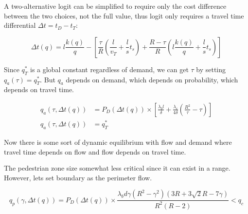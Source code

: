 \documentclass{article}
\begin{document}
A two-alternative logit can be simplified to require only the cost difference between the two choices, not the full value, thus logit only requires a travel time differential $\Delta t = t_D - t_T$:

\begin{equation}
    \Delta t(q) = l \frac{k(q)}{q} - \left[
    \frac{\tau}{R} \left( \frac{l}{v_T} + \frac{l}{s}t_s \right) + \frac{R-\tau}{R} \left( l\frac{k(q)}{q} + \frac{l}{s}t_s \right) \right]
\end{equation}

\noindent Since $q^*_T$ is a global constant regardless of demand, we can get $\tau$ by setting $q_a(\tau)=q^*_T$. But $q_a$ depends on demand, which depends on probability, which depends on travel time.

\begin{align}
    q_a(\tau, \Delta t(q)) & = P_D(\Delta t(q)) \times \left[ \frac{\lambda_b l}{\delta} + \frac{\lambda_c}{4\delta} \left( \frac{R^2}{\tau} - \tau \right) \right] \\
    q_a(\tau, \Delta t(q)) & = q^*_T
\end{align}

\noindent Now there is some sort of dynamic equilibrium with flow and demand where travel time depends on flow and flow depends on travel time. 

The pedestrian zone size somewhat less critical since it can exist in a range. However, lets set boundary as the perimeter flow.

\begin{equation}
        q_p(\gamma, \Delta t(q)) = P_D(\Delta t(q)) \times \frac{\lambda_b d \gamma (R^2 - \gamma^2) (3R + 3\sqrt{2}R - 7\gamma)}{R^2(R-2)} < q_c
\end{equation}
\end{document}
